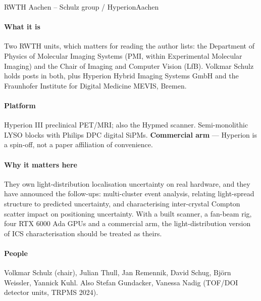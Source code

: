  
 
\begin{programnote}{RWTH Aachen -- Schulz group / Hyperion}{Aachen}
 
\paragraph{What it is}
Two RWTH units, which matters for reading the author lists: the Department of
Physics of Molecular Imaging Systems (PMI, within Experimental Molecular
Imaging) and the Chair of Imaging and Computer Vision (LfB). Volkmar Schulz
holds posts in both, plus Hyperion Hybrid Imaging Systems GmbH and the
Fraunhofer Institute for Digital Medicine MEVIS, Bremen.
 
 
\paragraph{Platform}
Hyperion III preclinical PET/MRI; also the Hypmed scanner. Semi-monolithic LYSO
blocks with Philips DPC digital SiPMs. \textbf{Commercial arm} --- Hyperion is a
spin-off, not a paper affiliation of convenience.
 
\paragraph{Why it matters here}
They own light-distribution localisation uncertainty on real hardware, and they
have announced the follow-ups: multi-cluster event analysis, relating
light-spread structure to predicted uncertainty, and characterising inter-crystal
Compton scatter impact on positioning uncertainty. With a built scanner, a
fan-beam rig, four RTX 6000 Ada GPUs and a commercial arm, the
light-distribution version of ICS characterisation should be treated as theirs.
 
\paragraph{People}
Volkmar Schulz (chair), Julian Thull, Jan Remennik, David Schug, Björn Weissler,
Yannick Kuhl. Also Stefan Gundacker, Vanessa Nadig (TOF/DOI detector units,
TRPMS 2024).
 

\end{programnote}
